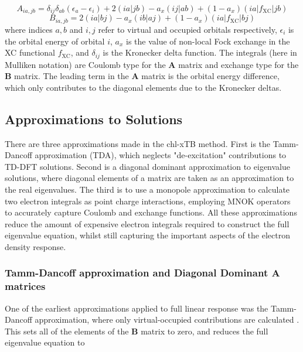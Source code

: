 \begin{equation}
A_{ia,jb} = \delta_{ij} \delta_{ab} \left( \epsilon_a - \epsilon_i \right) + 2\left(ia|jb\right) - a_x\left(ij|ab\right) + (1- a_x)\left(ia|f_{\text{XC}}|jb\right)
\end{equation}
%
\begin{equation}
B_{ia,jb} = 2\left(ia|bj\right) - a_x\left(ib|aj\right) + (1- a_x)\left(ia|f_{\text{XC}}|bj\right)
\end{equation}
%
where indices $a,b$ and $i,j$ refer to virtual and occupied orbitals respectively,
$\epsilon_i$ is the orbital energy of orbital $i$, $a_x$ is the value of non-local
Fock exchange in the XC functional $f_{\text{XC}}$, and $\delta_{ij}$ is the Kronecker
delta function. The integrals (here in Mulliken notation) are Coulomb type for the
$\mathbf{A}$ matrix and exchange type for the $\mathbf{B}$ matrix. The leading term
in the $\mathbf{A}$ matrix is the orbital energy difference, which only contributes
to the diagonal elements due to the Kronecker deltas.

\subsection{Approximations to Solutions}
\label{subsec:chl_approxs}

There are three approximations made in the chl-xTB method. First is the Tamm-Dancoff 
approximation (TDA), which neglects "de-excitation" contributions to TD-DFT solutions.
Second is a diagonal dominant approximation to eigenvalue solutions, where diagonal 
elements of a matrix are taken as an approximation to the real eigenvalues. The 
third is to use a monopole approximation to calculate two electron integrals as 
point charge interactions, employing MNOK operators to accurately capture Coulomb
and exchange functions. All these approximations reduce the amount of expensive 
electron integrals required to construct the full eigenvalue equation, whilst still
capturing the important aspects of the electron density response.

\subsubsection{Tamm-Dancoff approximation and Diagonal Dominant $\mathbf{A}$ matrices}
\label{subsubsec:Tamm_Dancoff}

One of the earliest approximations applied to full linear response was the Tamm-Dancoff
approximation, where only virtual-occupied contributions are calculated \cite{Hirata1999}. 
This sets all of the elements of the $\mathbf{B}$ matrix to zero, and reduces the
full eigenvalue equation to 

